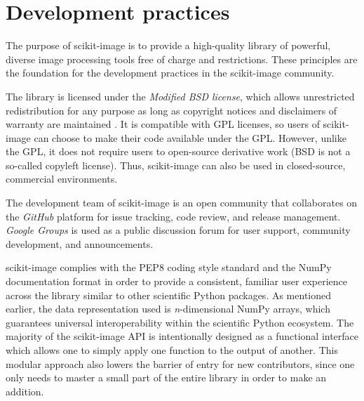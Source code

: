 
\section*{Development practices}
  \label{sec:development-practices}

  The purpose of scikit-image is to provide a high-quality library of powerful, diverse image processing tools free of charge and restrictions. These principles are the foundation for the development practices in the scikit-image community.

  The library is licensed under the \emph{Modified BSD license}, which allows unrestricted redistribution for any purpose as long as copyright notices and disclaimers of warranty are maintained \citep{BSD}. It is compatible with GPL licenses, so users of scikit-image can choose to make their code available under the GPL. However, unlike the GPL, it does not require users to open-source derivative work (BSD is not a so-called copyleft license). Thus, scikit-image can also be used in closed-source, commercial environments.

  The development team of scikit-image is an open community that collaborates on the \emph{GitHub} \citep{GitHub} platform for issue tracking, code review, and release management. \emph{Google Groups} \citep{GoogleGroups} is used as a public discussion forum for user support, community development, and announcements.

  scikit-image complies with the PEP8 coding style standard \citep{PEP8} and the NumPy documentation format \citep{NumpyDoc} in order to provide a consistent, familiar user experience across the library similar to other scientific Python packages. As mentioned earlier, the data representation used is \emph{n}-dimensional NumPy arrays, which guarantees universal interoperability within the scientific Python ecosystem. The majority of the scikit-image API is intentionally designed as a functional interface which allows one to simply apply one function to the output of another. This modular approach also lowers the barrier of entry for new contributors, since one only needs to master a small part of the entire library in order to make an addition.

